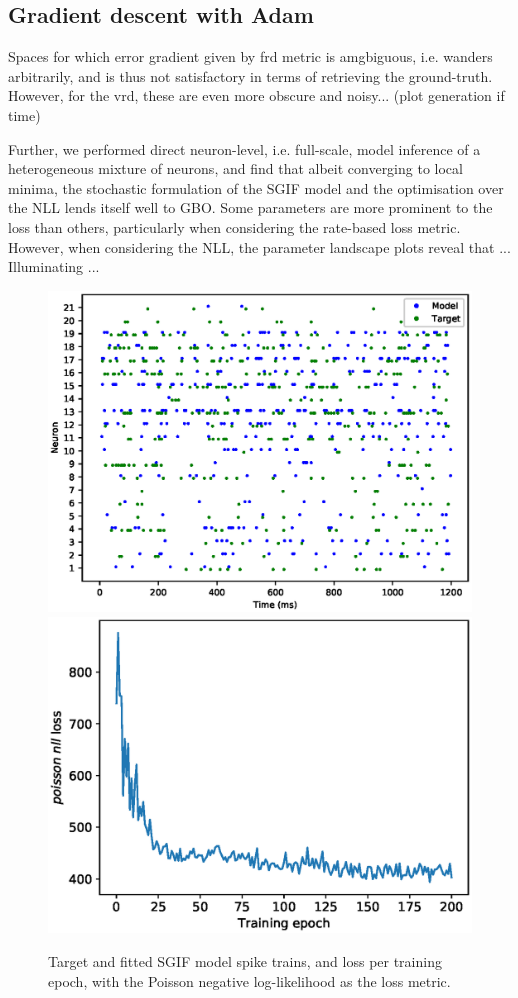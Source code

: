 \documentclass[mphil,deptreport,ianc]{infthesis} %
\begin{document}
\subsection{Gradient descent with Adam}

Spaces for which error gradient given by frd metric is amgbiguous, i.e. wanders arbitrarily, and is thus not satisfactory in terms of retrieving the ground-truth. 
However, for the vrd, these are even more obscure and noisy... (plot generation if time)

Further, we performed direct neuron-level, i.e. full-scale, model inference of a heterogeneous mixture of neurons, and find that albeit converging to local minima, the stochastic formulation of the SGIF model and the optimisation over the NLL lends itself well to GBO.
Some parameters are more prominent to the loss than others, particularly when considering the rate-based loss metric. 
However, when considering the NLL, the parameter landscape plots reveal that ...
Illuminating ...

\begin{figure}
    \centering
    \includegraphics[width=0.49\columnwidth]{figures/samples/SameModelClassTarget/poisson/12-09_17-56-51-235/export_spike_trains_euid_12-09_17-56-51-235.eps}
    \includegraphics[width=0.49\columnwidth]{figures/samples/SameModelClassTarget/poisson/12-09_17-56-51-235/export_microGIF_plot_loss_euid_12-09_17-56-51-235.eps}
    \caption{Target and fitted SGIF model spike trains, and loss per training epoch, with the Poisson negative log-likelihood as the loss metric.}
    \label{fig:sample_SGIF_plots}
\end{figure}
\end{document}
